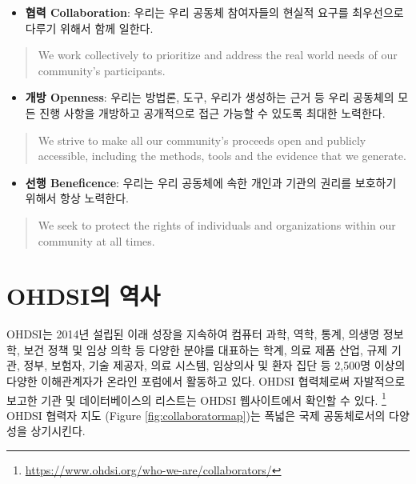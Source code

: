 \documentclass[11pt]{book}
\providecommand{\tightlist}{%
  \setlength{\itemsep}{0pt}\setlength{\parskip}{0pt}}
\let\rmarkdownfootnote\footnote%
\def\footnote{\protect\rmarkdownfootnote}
\theoremstyle{definition}
\theoremstyle{definition}
\theoremstyle{definition}
\theoremstyle{remark}
\begin{document}
\begin{itemize}
\tightlist
\item
  \textbf{협력 Collaboration}: 우리는 우리 공동체 참여자들의 현실적
  요구를 최우선으로 다루기 위해서 함께 일한다.
\end{itemize}

\begin{quote}
We work collectively to prioritize and address the real world needs of
our community's participants.
\end{quote}

\begin{itemize}
\tightlist
\item
  \textbf{개방 Openness}: 우리는 방법론, 도구, 우리가 생성하는 근거 등
  우리 공동체의 모든 진행 사항을 개방하고 공개적으로 접근 가능할 수
  있도록 최대한 노력한다.
\end{itemize}

\begin{quote}
We strive to make all our community's proceeds open and publicly
accessible, including the methods, tools and the evidence that we
generate.
\end{quote}

\begin{itemize}
\tightlist
\item
  \textbf{선행 Beneficence}: 우리는 우리 공동체에 속한 개인과 기관의
  권리를 보호하기 위해서 항상 노력한다.
\end{itemize}

\begin{quote}
We seek to protect the rights of individuals and organizations within
our community at all times.
\end{quote}


\hypertarget{ohdsi-}{\section{OHDSI의 역사}\label{ohdsi-}}

OHDSI는 2014년 설립된 이래 성장을 지속하여 컴퓨터 과학, 역학, 통계,
의생명 정보학, 보건 정책 및 임상 의학 등 다양한 분야를 대표하는 학계,
의료 제품 산업, 규제 기관, 정부, 보험자, 기술 제공자, 의료 시스템,
임상의사 및 환자 집단 등 2,500명 이상의 다양한 이해관계자가 온라인
포럼에서 활동하고 있다. OHDSI 협력체로써 자발적으로 보고한 기관 및
데이터베이스의 리스트는 OHDSI 웹사이트에서 확인할 수 있다. \footnote{\url{https://www.ohdsi.org/who-we-are/collaborators/}}
OHDSI 협력자 지도 (Figure \ref{fig:collaboratormap})는 폭넓은 국제
공동체로서의 다양성을 상기시킨다.
\end{document}

